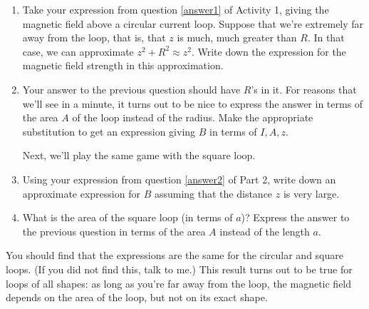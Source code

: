 \begin{enumerate}[labparts]

\item Take your expression from question \ref{answer1} of Activity 1,
giving the magnetic field above a circular current loop.
Suppose that we're extremely far away from the loop, that is,
that $z$ is much, much greater than $R$.  In that case, we can approximate
$z^2+R^2\approx z^2$.  Write down the expression for the magnetic
field strength in this approximation.  
\answerspace{0.7in}

\item Your answer to the previous question should have $R$'s in it.
For reasons that we'll see in a minute, it turns out to be nice
to express the answer in terms of the area $A$ of the loop instead of the
radius.  Make the appropriate substitution to get an expression
giving $B$ in terms of $I,A,z$.
\answerspace{0.7in}

Next, we'll play the same game with the square loop.  

\item Using your expression from question \ref{answer2} of Part 2,
write down an approximate expression for $B$ assuming that the distance
$z$ is very large.
\answerspace{0.7in}

\item What is the area of the square loop (in terms of $a$)?  
Express the answer to the previous question in terms of the area $A$
instead of the length $a$.
\answerspace{0.7in}

\end{enumerate}

You should find that the expressions are the same for the circular
and square loops.  (If you did not find this, talk to me.)
This result turns out to be true for loops of all shapes: as long as you're
far away from the loop, the magnetic field depends on the area of the loop,
but not on its exact shape.



